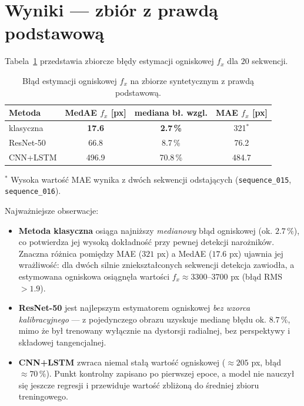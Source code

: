 \documentclass[12pt,a4paper]{report}
\begin{document}
\section{Wyniki --- zbiór z prawdą podstawową}
Tabela~\ref{tab:wyniki-gt} przedstawia zbiorcze błędy estymacji ogniskowej $f_x$ dla
$20$ sekwencji.

\begin{table}[htbp]
  \centering
  \caption{Błąd estymacji ogniskowej $f_x$ na zbiorze syntetycznym z prawdą podstawową.}
  \label{tab:wyniki-gt}
  \begin{tabular}{@{}lccc@{}}
    \toprule
    \textbf{Metoda} & \textbf{MedAE $f_x$ [px]} & \textbf{mediana bł. wzgl.} & \textbf{MAE $f_x$ [px]} \\
    \midrule
    klasyczna  & \textbf{17.6} & \textbf{2.7\,\%}  & 321$^\ast$ \\
    ResNet-50  & 66.8          & 8.7\,\%           & 76.2 \\
    CNN+LSTM   & 496.9         & 70.8\,\%          & 484.7 \\
    \bottomrule
  \end{tabular}

  \vspace{2pt}
  {\footnotesize $^\ast$ Wysoka wartość MAE wynika z dwóch sekwencji odstających
   (\texttt{sequence\_015}, \texttt{sequence\_016}).}
\end{table}

Najważniejsze obserwacje:
\begin{itemize}[leftmargin=*]
  \item \textbf{Metoda klasyczna} osiąga najniższy \emph{medianowy} błąd ogniskowej
        (ok. $2.7\,\%$), co potwierdza jej wysoką dokładność przy pewnej detekcji narożników.
        Znaczna różnica pomiędzy MAE ($321$ px) a MedAE ($17.6$ px) ujawnia jej wrażliwość:
        dla dwóch silnie zniekształconych sekwencji detekcja zawiodła, a estymowana ogniskowa
        osiągnęła wartości $f_x \approx 3300$--$3700$ px (błąd RMS $> 1.9$).
  \item \textbf{ResNet-50} jest najlepszym estymatorem ogniskowej \emph{bez wzorca
        kalibracyjnego} --- z pojedynczego obrazu uzyskuje medianę błędu ok. $8.7\,\%$, mimo
        że był trenowany wyłącznie na dystorsji radialnej, bez perspektywy i składowej
        tangencjalnej.
  \item \textbf{CNN+LSTM} zwraca niemal stałą wartość ogniskowej ($\approx 205$ px, błąd
        $\approx 70\,\%$). Punkt kontrolny zapisano po pierwszej epoce, a model nie nauczył się
        jeszcze regresji i przewiduje wartość zbliżoną do średniej zbioru treningowego.
\end{itemize}
\end{document}
